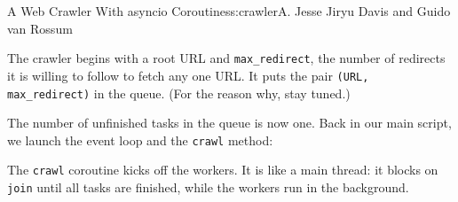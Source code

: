 \begin{aosachapter}{A Web Crawler With asyncio Coroutines}{s:crawler}{A. Jesse Jiryu Davis and Guido van Rossum}
\begin{Shaded}
\begin{Highlighting}[]
\NormalTok{,}
                           \NormalTok{)}

\end{Highlighting}
\end{Shaded}

The crawler begins with a root URL and \texttt{max\_redirect}, the
number of redirects it is willing to follow to fetch any one URL. It
puts the pair \texttt{(URL, max\_redirect)} in the queue. (For the
reason why, stay tuned.)

\begin{Shaded}
\begin{Highlighting}[]
 
     \NormalTok{(}
        \NormalTok{()}
        
\end{Highlighting}
\end{Shaded}

The number of unfinished tasks in the queue is now one. Back in our main
script, we launch the event loop and the \texttt{crawl} method:

\begin{Shaded}
\begin{Highlighting}[]
\end{Highlighting}
\end{Shaded}

The \texttt{crawl} coroutine kicks off the workers. It is like a main
thread: it blocks on \texttt{join} until all tasks are finished, while
the workers run in the background.

\begin{Shaded}
\begin{Highlighting}[]
     \NormalTok{):}
        \NormalTok{workers = [asyncio.Task(}
                    \NormalTok{(}\NormalTok{.max_tasks)]}


\end{Highlighting}
\end{Shaded}
\end{aosachapter}
